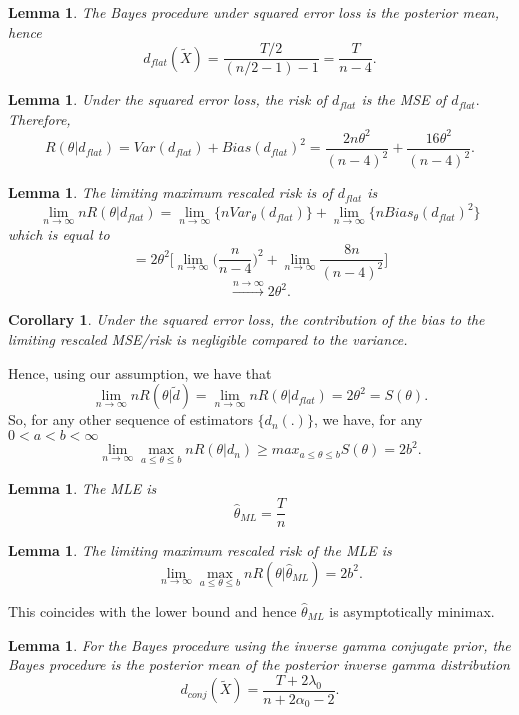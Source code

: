 \documentclass[twoside]{article}
\newtheorem{lemma}[theorem]{Lemma}
\newtheorem{corollary}[theorem]{Corollary}
\begin{document}
\begin{lemma}The Bayes procedure under squared error loss is the posterior mean, hence 
$$
d_{flat}(\tilde{X}) = \frac{T/2}{(n/2 - 1) - 1} = \frac{T}{n - 4}.
$$
\end{lemma}

\begin{lemma}Under the squared error loss, the risk of $d_{flat}$ is the MSE of $d_{flat}.$ Therefore,
$$
R(\theta|d_{flat}) = Var(d_{flat}) + Bias(d_{flat})^2 = \frac{2n\theta^2}{(n-4)^2} + \frac{16\theta^2}{(n-4)^2}.
$$
\end{lemma}

\begin{lemma}The limiting maximum rescaled risk is of $d_{flat}$ is 
$$
\lim_{n \rightarrow \infty}nR(\theta|d_{flat}) = \lim_{n \rightarrow \infty}\{nVar_{\theta}(d_{flat})\} + \lim_{n \rightarrow \infty}\{nBias_{\theta}(d_{flat})^2\}
$$
which is equal to 
$$
= 2\theta^2 \bigg[ \lim_{n \rightarrow \infty}\bigg(\frac{n}{n-4}\bigg)^2 + \lim_{n \rightarrow \infty}\frac{8n}{(n-4)^2} \bigg]
$$
$$
\xrightarrow{n \rightarrow \infty}2\theta^2.
$$
\end{lemma}

\begin{corollary}Under the squared error loss, the contribution of the bias to the limiting rescaled MSE/risk is negligible compared to the variance.
\end{corollary}

Hence, using our assumption, we have that 
$$
\lim_{n \rightarrow \infty}nR(\theta|\tilde{d}) = \lim_{n \rightarrow \infty}nR(\theta|d_{flat}) = 2\theta^2  = S(\theta).
$$
So, for any other sequence of estimators $\{d_n(.)\}$, we have, for any $0 < a < b < \infty$
$$
\lim_{n \rightarrow \infty}\max_{a \leq \theta \leq b}nR(\theta|d_n) \geq max_{a \leq \theta \leq b}S(\theta) = 2b^2.
$$

\begin{lemma}The MLE is 
$$
\hat{\theta}_{ML} = \frac{T}{n}
$$
\end{lemma}

\begin{lemma}The limiting maximum rescaled risk of the MLE is 
$$
\lim_{n \rightarrow \infty}\max_{a \leq \theta \leq b}nR(\theta|\hat{\theta}_{ML}) = 2b^2.
$$
\end{lemma}

This coincides with the lower bound and hence $\hat{\theta}_{ML}$ is asymptotically minimax.

\begin{lemma}For the Bayes procedure using the inverse gamma conjugate prior, the Bayes procedure is the posterior mean of the posterior inverse gamma distribution 
$$
d_{conj}(\tilde{X}) = \frac{T + 2\lambda_0}{n + 2\alpha_0 - 2}.
$$
\end{lemma}
\end{document}

